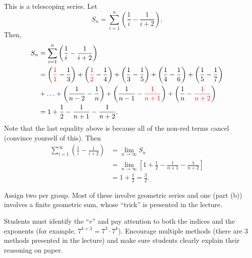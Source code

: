 \documentclass[noinstructornotes]{ximera}
\begin{document}
\begin{problem}
\begin{enumerate}
	\begin{freeResponse}
	This is a telescoping series.  
	Let 
		\[
		S_n = \sum_{i=1}^n \left( \frac{1}{i} - \frac{1}{i+2} \right).
		\]
	Then,
		\begin{align*}
		S_n &= \sum_{i=1}^n \left( \frac{1}{i} - \frac{1}{i+2} \right)  \\
		&= \left( {\color{red}\frac{1}{1}} - \frac{1}{3} \right) + \left( {\color{red}\frac{1}{2}} - \frac{1}{4} \right) + \left( \frac{1}{3} - \frac{1}{5} \right) + \left( \frac{1}{4} - \frac{1}{6} \right) + \left( \frac{1}{5} - \frac{1}{7} \right)  \\
		&+ \hdots + \left( \frac{1}{n-2} - \frac{1}{n} \right) + \left( \frac{1}{n-1} - {\color{red}\frac{1}{n+1}} \right) + \left( \frac{1}{n} - {\color{red}\frac{1}{n+2}} \right)  \\
		&= 1 + \frac{1}{2} - \frac{1}{n+1} - \frac{1}{n+2}.
		\end{align*}
	Note that the last equality above is because all of the non-red terms cancel (convince yourself of this).  
	Then
		\begin{align*}
		\sum_{i=1}^\infty \left( \frac{1}{i} - \frac{1}{i+2} \right)
		&= \lim_{n \to \infty} S_n  \\
		&= \lim_{n \to \infty} \left[ 1 + \frac{1}{2} - \frac{1}{n+1} - \frac{1}{n+2} \right]  \\
		&= 1 + \frac{1}{2} = \frac{3}{2}.
		\end{align*}
	\end{freeResponse}
	
	\end{enumerate}
	
\end{problem}

\begin{instructorNotes}
Assign two per group.  
Most of these involve geometric series and one (part (b)) involves a finite geometric sum, whose ``trick'' is presented in the lecture.  

Students must identify the ``$r$'' and pay attention to both the indices and the exponents (for example, $7^{k+3} = 7^3 \cdot 7^k$).  
Encourage multiple methods (there are $3$ methods presented in the lecture) and make sure students clearly explain their reasoning on paper.  
\end{instructorNotes}
\end{document}
